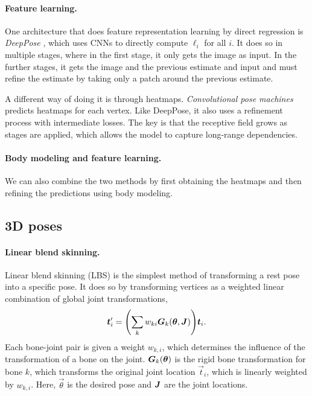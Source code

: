 \paragraph{Feature learning.}

One architecture that does feature representation learning by direct regression is
\textit{DeepPose} \citep{toshev2014deeppose}, which uses CNNs to directly compute $\ell_i$ for all
$i$. It does so in multiple stages, where in the first stage, it only gets the image as input. In
the further stages, it gets the image and the previous estimate and input and must refine the
estimate by taking only a patch around the previous estimate.

A different way of doing it is through heatmaps. \textit{Convolutional pose machines}
\citep{wei2016convolutional} predicts heatmaps for each vertex. Like DeepPose, it also uses a
refinement process with intermediate losses. The key is that the receptive field grows as stages
are applied, which allows the model to capture long-range dependencies.

\paragraph{Body modeling and feature learning.}

We can also combine the two methods by first obtaining the heatmaps and then refining the
predictions using body modeling.

\subsection{3D poses}

\paragraph{Linear blend skinning.}

Linear blend skinning (LBS) is the simplest method of transforming a rest pose into a specific
pose. It does so by transforming vertices as a weighted linear combination of global joint
transformations, \[
    \vec{t}_i' = \lft( \sum_{k} w_{ki} \mat{G}_k(\vec{\theta}, \mat{J}) \rgt) \vec{t}_i.
\]
Each bone-joint pair is given a weight $w_{k,i}$, which determines the influence of the
transformation of a bone on the joint. $\bm{G}_k(\bm{\theta})$ is the rigid bone transformation
for bone $k$, which transforms the original joint location $\vec{t}_i$, which is linearly weighted
by $w_{k,i}$. Here, $\vec{\theta}$ is the desired pose and $\bm{J}$ are the joint locations.

